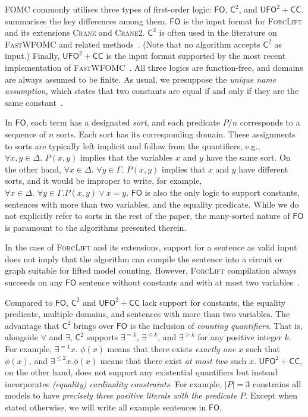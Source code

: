 \documentclass[a4paper,UKenglish,cleveref,autoref]{lipics-v2021}
\newcommand{\Cranetwo}{\textsc{Crane2}}
\newcommand{\Ctwo}{$\mathsf{C}^{2}$}
\newcommand{\FO}{$\mathsf{FO}$}
\newcommand{\UFO}{$\mathsf{UFO}^{2} + \mathsf{CC}$}
\begin{document}
FOMC commonly utilises three types of first-order logic: \FO{}, \Ctwo{}, and
\UFO{}.  summarises the key differences among them. \FO{} is
the input format for \textsc{ForcLift} and its extensions \textsc{Crane} and
\Cranetwo{}. \Ctwo{} is often used in the literature on \textsc{FastWFOMC} and
related methods~\cite{DBLP:journals/jair/Kuzelka21,DBLP:conf/aaai/MalhotraS22}.
(Note that no algorithm accepts \Ctwo{} as input.) Finally, \UFO{} is the input
format supported by the most recent implementation of
\textsc{FastWFOMC}~\cite{DBLP:conf/kr/TothK24}. All three logics are
function-free, and domains are always assumed to be finite. As usual, we
presuppose the \emph{unique name assumption}, which states that two constants
are equal if and only if they are the same constant~\cite{DBLP:books/aw/RN2020}.

In \FO{}, each term has a designated \emph{sort}, and each predicate $P/n$
corresponds to a sequence of $n$ sorts. Each sort has its corresponding domain.
These assignments to sorts are typically left implicit and follow from the
quantifiers, e.g., $\forall x,y \in \Delta\text{. }P(x, y)$ implies that the
variables $x$ and $y$ have the same sort. On the other hand,
$\forall x \in \Delta\text{. }\forall y \in \Gamma\text{. } P(x, y)$ implies
that $x$ and $y$ have different sorts, and it would be improper to write, for
example, $\forall x \in \Delta\text{. }\forall y \in \Gamma\text{.
} P(x, y) \lor x = y$. \FO{} is also the only logic to support constants,
sentences with more than two variables, and the equality predicate. While we do
not explicitly refer to sorts in the rest of the paper, the many-sorted nature
of \FO{} is paramount to the algorithms presented therein.

\begin{remark*}
  In the case of \textsc{ForcLift} and its extensions, support for a sentence as
  valid input does not imply that the algorithm can compile the sentence into a
  circuit or graph suitable for lifted model counting. However,
  \textsc{ForcLift} compilation always succeeds on any \FO{} sentence without
  constants and with at most two
  variables~\cite{DBLP:conf/nips/Broeck11,DBLP:conf/kr/BroeckMD14}.
\end{remark*}

Compared to \FO{}, \Ctwo{} and \UFO{} lack support for constants, the equality
predicate, multiple domains, and sentences with more than two variables. The
advantage that \Ctwo{} brings over \FO{} is the inclusion of \emph{counting
  quantifiers}. That is, alongside $\forall$ and $\exists$, \Ctwo{} supports
$\exists^{=k}$, $\exists^{\le k}$, and $\exists^{\ge k}$ for any positive
integer $k$. For example, $\exists^{=1} x\text{. }\phi(x)$ means that there
exists \emph{exactly one} $x$ such that $\phi(x)$, and $\exists^{\le 2} x\text{.
}\phi(x)$ means that there exist \emph{at most two} such $x$. \UFO{}, on the
other hand, does not support any existential quantifiers but instead
incorporates \emph{(equality) cardinality constraints}. For example, $|P| = 3$
constrains all models to have \emph{precisely three positive literals with the
  predicate $P$}. Except when stated otherwise, we will write all example
sentences in \FO{}.
\end{document}
